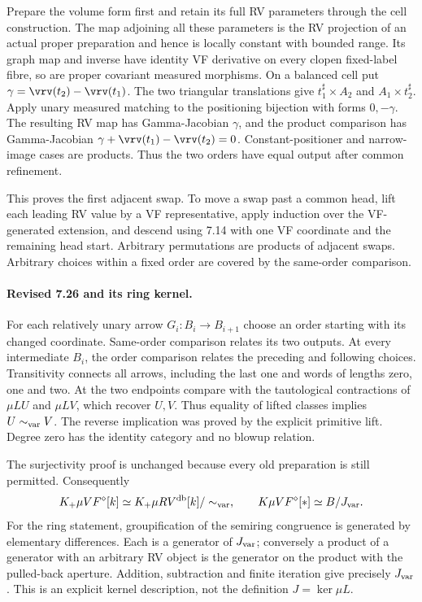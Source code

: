 Prepare the volume form first and retain its full RV parameters through
the cell construction. The map adjoining all these parameters is the
RV projection of an actual proper preparation and hence is locally
constant with bounded range. Its graph map and inverse have identity
VF derivative on every clopen fixed-label fibre, so are proper covariant
measured morphisms. On a balanced cell put
$\gamma=\vrv(t_2)-\vrv(t_1)$. The two triangular translations give
$t_1^\sharp\times A_2$ and $A_1\times t_2^\sharp$. Apply unary measured
matching to the positioning bijection with forms $0,-\gamma$.
The resulting RV map has Gamma-Jacobian $\gamma$, and the product
comparison has Gamma-Jacobian
$\gamma+\vrv(t_1)-\vrv(t_2)=0$. Constant-positioner and narrow-image
cases are products. Thus the two orders have equal output after common
refinement.

This proves the first adjacent swap. To move a swap past a common head,
lift each leading RV value by a VF representative, apply induction over
the VF-generated extension, and descend using 7.14 with one VF coordinate
and the remaining head start. Arbitrary permutations are products of
adjacent swaps. Arbitrary choices within a fixed order are covered by
the same-order comparison.

\paragraph{Revised 7.26 and its ring kernel.}
For each relatively unary arrow $G_i:B_i\to B_{i+1}$ choose an order
starting with its changed coordinate. Same-order comparison relates its
two outputs. At every intermediate $B_i$, the order comparison relates
the preceding and following choices. Transitivity connects all arrows,
including the last one and words of lengths zero, one and two. At the
two endpoints compare with the tautological contractions of $\mu L U$
and $\mu L V$, which recover $U,V$. Thus equality of lifted classes
implies $U\sim_{\rm var}V$. The reverse implication was proved by the
explicit primitive lift. Degree zero has the identity category and no
blowup relation.

The surjectivity proof is unchanged because every old preparation is
still permitted. Consequently
\[
 K_+\mu VF^\diamond[k]\simeq K_+\mu RV^{\rm db}[k]/\sim_{\rm var},
 \qquad
 K\mu VF^\diamond[*]\simeq B/J_{\rm var}.
\]
For the ring statement, groupification of the semiring congruence is
generated by elementary differences. Each is a generator of $J_{\rm var}$;
conversely a product of a generator with an arbitrary RV object is the
generator on the product with the pulled-back aperture. Addition,
subtraction and finite iteration give precisely $J_{\rm var}$. This
is an explicit kernel description, not the definition $J=\ker\mu L$.

